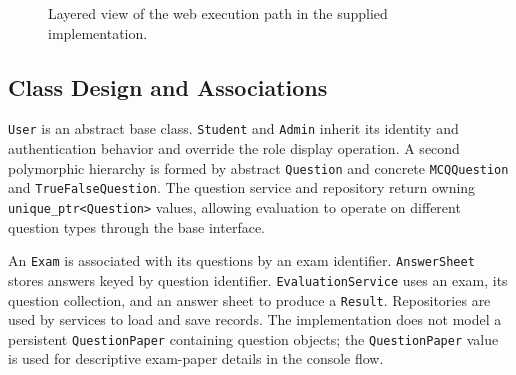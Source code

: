 \documentclass[12pt,a4paper,oneside]{book}
\begin{document}
\begin{figure}[htbp]
\centering
{} 
\caption{Layered view of the web execution path in the supplied implementation.}
\label{fig:architecture}
\end{figure}

\subsection{Class Design and Associations}
\texttt{User} is an abstract base class. \texttt{Student} and \texttt{Admin} inherit its identity and authentication behavior and override the role display operation. A second polymorphic hierarchy is formed by abstract \texttt{Question} and concrete \texttt{MCQQuestion} and \texttt{TrueFalseQuestion}. The question service and repository return owning \texttt{unique\_ptr<Question>} values, allowing evaluation to operate on different question types through the base interface.

An \texttt{Exam} is associated with its questions by an exam identifier. \texttt{AnswerSheet} stores answers keyed by question identifier. \texttt{EvaluationService} uses an exam, its question collection, and an answer sheet to produce a \texttt{Result}. Repositories are used by services to load and save records. The implementation does not model a persistent \texttt{QuestionPaper} containing question objects; the \texttt{QuestionPaper} value is used for descriptive exam-paper details in the console flow.
\end{document}

